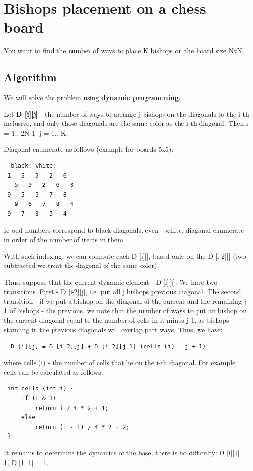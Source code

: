 \section{ Bishops placement on a chess board }
You want to find the number of ways to place K bishops on the board size NxN.

\subsection{ Algorithm }
We will solve the problem using \textbf{dynamic programming.}

Let \textbf{D [i][j]} - the number of ways to arrange j bishops on the diagonals to the i-th inclusive, and only those diagonals are the same color as the i-th diagonal. Then i = 1.. 2N-1, j = 0.. K.

Diagonal enumerate as follows (example for boards 5x5):

\begin{verbatim}
  black: white:
 1 _ 5 _ 9 _ 2 _ 6 _
 _ 5 _ 9 _ 2 _ 6 _ 8
 9 _ 5 _ 6 _ 7 _ 8 _ 
 _ 9 _ 6 _ 7 _ 8 _ 4
 9 _ 7 _ 8 _ 3 _ 4 _ 
\end{verbatim}
Ie odd numbers correspond to black diagonals, even - white, diagonal enumerate in order of the number of items in them.

With such indexing, we can compute each D [i][], based only on the D [i-2][] (two subtracted we treat the diagonal of the same color).

Thus, suppose that the current dynamic element - D [i][j]. We have two transitions. First - D [i-2][j], i.e. put all j bishops previous diagonal. The second transition - if we put a bishop on the diagonal of the current and the remaining j-1 of bishops - the previous, we note that the number of ways to put an bishop on the current diagonal equal to the number of cells in it minus j-1, as bishops standing in the previous diagonals will overlap part ways. Thus, we have:

\begin{verbatim}
  D [i][j] = D [i-2][j] + D [i-2][j-1] (cells (i) - j + 1) 
\end{verbatim}
where cells (i) - the number of cells that lie on the i-th diagonal. For example, cells can be calculated as follows:

\begin{verbatim}
 int cells (int i) {
     if (i & 1)
         return i / 4 * 2 + 1;
     else
         return (i - 1) / 4 * 2 + 2;
 } 
\end{verbatim}
It remains to determine the dynamics of the base, there is no difficulty: D [i][0] = 1, D [1][1] = 1.

